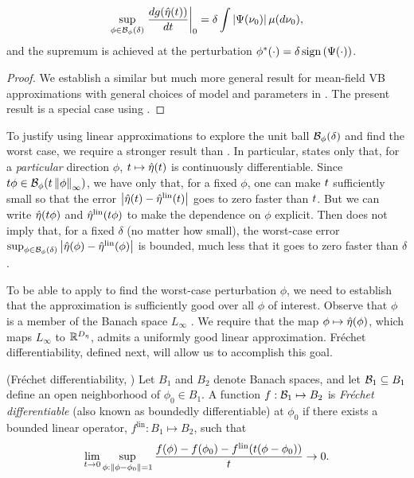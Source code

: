 \begin{cor}
\begin{align*}
%
\sup_{\phi \in \ball_\phi(\delta)}
    \fracat{d g(\etaopt(\t))}{d \t}{0} =
        \delta \int \abs{\infl(\nu_0)} \mu(d\nu_0),
%
\end{align*}
%
and the supremum is achieved at the perturbation
$\phi^*(\cdot) = \delta \, \mathrm{sign}\left(\Psi(\cdot)\right)$.
%
\end{cor}
%
\begin{proof}
%
We establish a similar but much more general result for mean-field VB approximations with general choices of model and parameters in . The present result is a special case using .
%
\end{proof}

To justify using linear approximations to explore the unit ball
$\mathcal{B}_\phi(\delta)$ and find the worst case, we require a stronger result than
. In particular, 
states only that, for a {\em particular} direction $\phi$, $t \mapsto
\hat\eta(t)$ is continuously differentiable.  Since $t \phi \in
\mathcal{B}_\phi(t \left\Vert\phi\right\Vert_{\infty})$, we have only that, for a fixed $\phi$,
one can make $t$ sufficiently small so that the error $\left|\hat\eta(t) -
\hat\eta^{\mathrm{lin}}(t)\right|$ goes to zero faster than $t$. But we can write $\hat\eta(t\phi)$ and $\hat\eta^{\mathrm{lin}}(t \phi)$ 
to make the dependence on $\phi$ explicit. Then  does not imply
that, for a fixed $\delta$ (no matter how small), the worst-case error
$\sup_{\phi \in \mathcal{B}_\phi(\delta)} \left|\hat\eta(\phi) - \hat\eta^{\mathrm{lin}}(\phi)\right|$ is
bounded, much less that it goes to zero faster than $\delta$.

To be able to apply  to find the worst-case perturbation $\phi$, 
we need to establish that the approximation is sufficiently good over all $\phi$ of interest.
Observe that $\phi$ is a member of the Banach
space $L_\infty$ \citep[Theorem 5.2.1]{dudley:2018:real}.  We require that the
map $\phi \mapsto \hat\eta(\phi)$, which maps $L_\infty$ to
$\mathbb{R}^{D_{\eta}}$, admits a uniformly good linear approximation.
Fr{\'e}chet differentiability, defined next, will allow us to accomplish this goal.

\begin{defn}
    (Fr{\'e}chet differentiability,
    \citep[Definition 4.5]{zeidler:2013:functional})
%
Let $B_1$ and $B_2$ denote Banach spaces, and let $\mathcal{B}_1 \subseteq B_1$ define
an open neighborhood of $\phi_0 \in B_1$.
%
A function $f: \mathcal{B}_1 \mapsto B_2$ is {\em Fr{\'echet} differentiable} (also
known as boundedly differentiable) at $\phi_0$ if there exists a  bounded linear
operator, $f^{\mathrm{lin}}: B_1 \mapsto B_2$, such that
%
\begin{align*}
%
\lim_{t \rightarrow 0}
    \sup_{\phi: \norm{\phi - \phi_0} = 1}
    \frac{f(\phi) - f(\phi_0) -
          f^{\mathrm{lin}}(t (\phi - \phi_0))
         }{t} \rightarrow 0.
%
\end{align*}
%
\end{defn}

